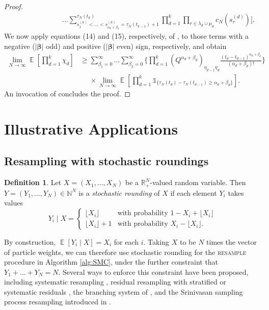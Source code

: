 \documentclass{article} %
\theoremstyle{definition}
\newtheorem{definition}{Definition}
\DeclareMathOperator{\E}{\mathbb{E}}
\newcommand{\1}[1]{\mathbbm{1}_{\{#1\}}}
\begin{document}
\begin{proof}
\begin{align*}
&\phantom{\geq \times \lim_{ N \rightarrow \infty } \E\Bigg[} \ldots \sum_{ s_1^{ ( k ) } < \ldots < s_{ \alpha_k + \beta_k }^{ ( k ) } = \tau_N( t_{ k - 1 } ) + 1 }^{ \tau_N( t_k ) } \prod_{ d = 1 }^k \prod_{ r \in \lambda_d \cup \mu_d } c_N( s_r^{ ( d ) } ) \Bigg].
\end{align*}
We now apply equations (14) and (15), respectively, of \cite{koskela2018},  to those terms with a negative ($|\bm{\beta}|$ odd) and positive ($|\bm{\beta}|$ even) sign, respectively, and obtain
\begin{align*}
\lim_{ N \rightarrow \infty } \E\left[ \prod_{ d = 1 }^k \chi_d \right]
&\geq \sum_{ \beta_1 = 0 }^{ \infty } \ldots \sum_{ \beta_k = 0 }^{ \infty } \Bigg\{ \prod_{ d = 1 }^k ( Q^{ \alpha_d + \beta_d } )_{ \eta_{ d - 1 } \eta_d } \frac{ ( t_d - t_{ d - 1 } )^{ \alpha_d + \beta_d } }{ ( \alpha_d + \beta_d ) ! } \Bigg\} \\
&\phantom{\geq} \times \lim_{ N \rightarrow \infty } \E\left[ \prod_{ d = 1 }^k \mathds{ 1 }_{ \{ \tau_N( t_d ) - \tau_N( t_{ d - 1 } ) \geq \alpha_d + \beta_d \} } \right].
\end{align*}
An invocation of \cite[Eq (16)]{koskela2018} concludes the proof.
\end{proof}


\section{Illustrative Applications}\label{sec:applications}
\subsection{Resampling with stochastic roundings}
\begin{definition}\label{defn:stochround}
 Let $X=(X_1,\dots,X_N)$ be a $\mathbb{R}_+^N$-valued random variable. Then $Y=(Y_1,\dots,Y_N) \in \mathbb{N}^N$ is a \emph{stochastic rounding} of $X$ if each element $Y_i$ takes values
\begin{equation*}
Y_i \mid X =
\begin{cases}
 \lfloor X_i \rfloor & \text{with probability } 1- X_i+ \lfloor X_i \rfloor \\
  \lfloor X_i \rfloor +1 & \text{with probability } X_i- \lfloor X_i \rfloor .
\end{cases}
\end{equation*}
\end{definition}

By construction, $\E[Y_i \mid X] = X_i$ for each $i$. Taking $X$ to be $N$ times the vector of particle weights, we can therefore use stochastic rounding for the \textsc{resample} procedure in Algorithm \ref{alg:SMC}, under the further constraint that $Y_1 + \dots + Y_N = N$. Several ways to enforce this constraint have been proposed, including systematic resampling \cite{carpenter1999, whitley1994}, residual resampling with stratified or systematic residuals \cite{whitley1994}, the branching system of \cite{crisan1997}, and the Srinivasan sampling process resampling introduced in \cite{gerber2017}.
\end{document}
